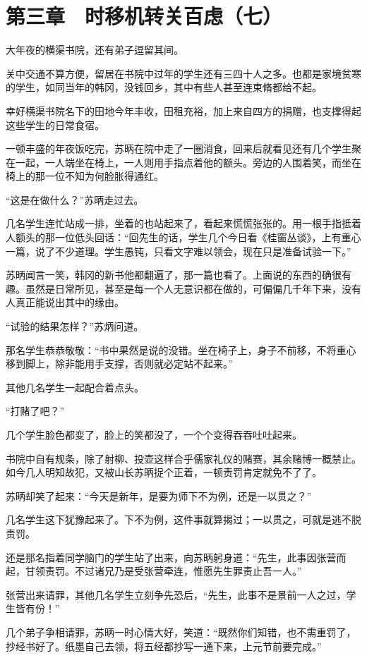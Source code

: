 \section{第三章　时移机转关百虑（七）}

大年夜的横渠书院，还有弟子逗留其间。

关中交通不算方便，留居在书院中过年的学生还有三四十人之多。也都是家境贫寒的学生，如同当年的韩冈，没钱回乡，其中有些人甚至连束脩都给不起。

幸好横渠书院名下的田地今年丰收，田租充裕，加上来自四方的捐赠，也支撑得起这些学生的日常食宿。

一顿丰盛的年夜饭吃完，苏昞在院中走了一圈消食，回来后就看见还有几个学生聚在一起，一人端坐在椅上，一人则用手指点着他的额头。旁边的人围着笑，而坐在椅上的那一位不知为何脸胀得通红。

“这是在做什么？”苏昞走过去。

几名学生连忙站成一排，坐着的也站起来了，看起来慌慌张张的。用一根手指抵着人额头的那一位低头回话：“回先生的话，学生几个今日看《桂窗丛谈》，上有重心一篇，说了不少道理。学生愚钝，只看文字难以领会，现在只是准备试验一下。”

苏昞闻言一笑，韩冈的新书他都翻遍了，那一篇也看了。上面说的东西的确很有趣。虽然是日常所见，甚至是每一个人无意识都在做的，可偏偏几千年下来，没有人真正能说出其中的缘由。

“试验的结果怎样？”苏炳问道。

那名学生恭恭敬敬：“书中果然是说的没错。坐在椅子上，身子不前移，不将重心移到脚上，除非能用手支撑，否则就必定站不起来。”

其他几名学生一起配合着点头。

“打赌了吧？”

几个学生脸色都变了，脸上的笑都没了，一个个变得吞吞吐吐起来。

书院中自有规条，除了射柳、投壶这样合乎儒家礼仪的赌赛，其余赌博一概禁止。如今几人明知故犯，又被山长苏昞捉个正着，一顿责罚肯定就免不了了。

苏昞却笑了起来：“今天是新年，是要为师下不为例，还是一以贯之？”

几名学生这下犹豫起来了。下不为例，这件事就算揭过；一以贯之，可就是逃不脱责罚。

还是那名指着同学脑门的学生站了出来，向苏昞躬身道：“先生，此事因张营而起，甘领责罚。不过诸兄乃是受张营牵连，惟愿先生罪责止吾一人。”

张营出来请罪，其他几名学生立刻争先恐后，“先生，此事不是景前一人之过，学生皆有份！”

几个弟子争相请罪，苏昞一时心情大好，笑道：“既然你们知错，也不需重罚了，抄经书好了。纸墨自己去领，将五经都抄写一通下来，上元节前要完成。”

